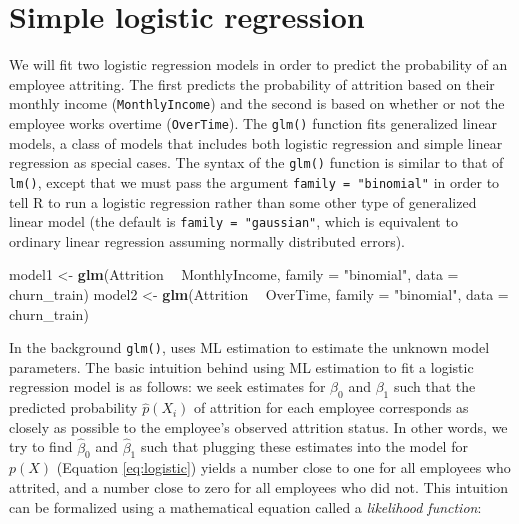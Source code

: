 \documentclass[]{krantz}
\makeatletter
\newenvironment{Shaded}{\begin{snugshade}}{\end{snugshade}}
\newcommand{\DataTypeTok}[1]{\textcolor[rgb]{0.27,0.27,0.27}{#1}}
\newcommand{\KeywordTok}[1]{\textcolor[rgb]{0.27,0.27,0.27}{\textbf{#1}}}
\newcommand{\NormalTok}[1]{#1}
\newcommand{\OperatorTok}[1]{\textcolor[rgb]{0.43,0.43,0.43}{\textbf{#1}}}
\newcommand{\StringTok}[1]{\textcolor[rgb]{0.5,0.5,0.5}{#1}}
\newenvironment{kframe}{%
\medskip{}
\setlength{\fboxsep}{.8em}
 \def\at@end@of@kframe{}%
 \ifinner\ifhmode%
  \def\at@end@of@kframe{\end{minipage}}%
  \begin{minipage}{\columnwidth}%
 \fi\fi%
 \def\FrameCommand##1{\hskip\@totalleftmargin \hskip-\fboxsep
 \colorbox{shadecolor}{##1}\hskip-\fboxsep
     \hskip-\linewidth \hskip-\@totalleftmargin \hskip\columnwidth}%
 \MakeFramed {\advance\hsize-\width
   \@totalleftmargin\z@ \linewidth\hsize
   \@setminipage}}%
 {\par\unskip\endMakeFramed%
 \at@end@of@kframe}
\renewenvironment{Shaded}{\begin{kframe}}{\end{kframe}}
\makeatother
\begin{document}
\hypertarget{simple-logistic-regression}{%
\section{Simple logistic regression}\label{simple-logistic-regression}}

We will fit two logistic regression models in order to predict the probability of an employee attriting. The first predicts the probability of attrition based on their monthly income (\texttt{MonthlyIncome}) and the second is based on whether or not the employee works overtime (\texttt{OverTime}). The \texttt{glm()} function fits generalized linear models, a class of models that includes both logistic regression and simple linear regression as special cases. The syntax of the \texttt{glm()} function is similar to that of \texttt{lm()}, except that we must pass the argument \texttt{family\ =\ "binomial"} in order to tell R to run a logistic regression rather than some other type of generalized linear model (the default is \texttt{family\ =\ "gaussian"}, which is equivalent to ordinary linear regression assuming normally distributed errors).

\begin{Shaded}
\begin{Highlighting}[]
\NormalTok{model1 <-}\StringTok{ }\KeywordTok{glm}\NormalTok{(Attrition }\OperatorTok{~}\StringTok{ }\NormalTok{MonthlyIncome, }\DataTypeTok{family =} \StringTok{"binomial"}\NormalTok{, }
              \DataTypeTok{data =}\NormalTok{ churn_train)}
\NormalTok{model2 <-}\StringTok{ }\KeywordTok{glm}\NormalTok{(Attrition }\OperatorTok{~}\StringTok{ }\NormalTok{OverTime, }\DataTypeTok{family =} \StringTok{"binomial"}\NormalTok{, }
              \DataTypeTok{data =}\NormalTok{ churn_train)}
\end{Highlighting}
\end{Shaded}

In the background \texttt{glm()}, uses ML estimation to estimate the unknown model parameters. The basic intuition behind using ML estimation to fit a logistic regression model is as follows: we seek estimates for \(\beta_0\) and \(\beta_1\) such that the predicted probability \(\widehat p\left(X_i\right)\) of attrition for each employee corresponds as closely as possible to the employee's observed attrition status. In other words, we try to find \(\widehat \beta_0\) and \(\widehat \beta_1\) such that plugging these estimates into the model for \(p\left(X\right)\) (Equation \eqref{eq:logistic}) yields a number close to one for all employees who attrited, and a number close to zero for all employees who did not. This intuition can be formalized using a mathematical equation called a \emph{likelihood function}:
\end{document}
